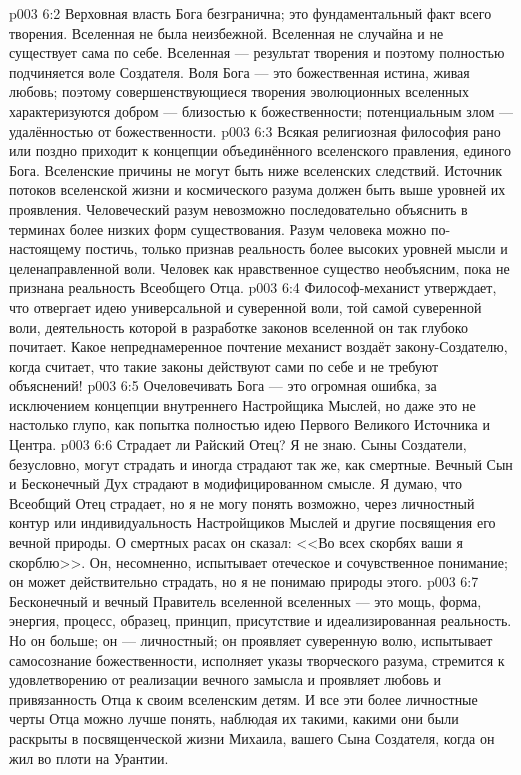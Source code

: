 \vs p003 6:2 Верховная власть Бога безгранична; это фундаментальный факт всего творения. Вселенная не была неизбежной. Вселенная не случайна и не существует сама по себе. Вселенная --- результат творения и поэтому полностью подчиняется воле Создателя. Воля Бога --- это божественная истина, живая любовь; поэтому совершенствующиеся творения эволюционных вселенных характеризуются добром --- близостью к божественности; потенциальным злом --- удалённостью от божественности.
\vs p003 6:3 \pc Всякая религиозная философия рано или поздно приходит к концепции объединённого вселенского правления, единого Бога. Вселенские причины не могут быть ниже вселенских следствий. Источник потоков вселенской жизни и космического разума должен быть выше уровней их проявления. Человеческий разум невозможно последовательно объяснить в терминах более низких форм существования. Разум человека можно по\hyp{}настоящему постичь, только признав реальность более высоких уровней мысли и целенаправленной воли. Человек как нравственное существо необъясним, пока не признана реальность Всеобщего Отца.
\vs p003 6:4 Философ\hyp{}механист утверждает, что отвергает идею универсальной и суверенной воли, той самой суверенной воли, деятельность которой в разработке законов вселенной он так глубоко почитает. Какое непреднамеренное почтение механист воздаёт закону\hyp{}Создателю, когда считает, что такие законы действуют сами по себе и не требуют объяснений!
\vs p003 6:5 Очеловечивать Бога --- это огромная ошибка, за исключением концепции внутреннего Настройщика Мыслей, но даже это не настолько глупо, как попытка полностью  идею Первого Великого Источника и Центра.
\vs p003 6:6 \pc Страдает ли Райский Отец? Я не знаю. Сыны Создатели, безусловно, могут страдать и иногда страдают так же, как смертные. Вечный Сын и Бесконечный Дух страдают в модифицированном смысле. Я думаю, что Всеобщий Отец страдает, но я не могу понять  возможно, через личностный контур или индивидуальность Настройщиков Мыслей и другие посвящения его вечной природы. О смертных расах он сказал: <<Во всех скорбях ваши я скорблю>>. Он, несомненно, испытывает отеческое и сочувственное понимание; он может действительно страдать, но я не понимаю природы этого.
\vs p003 6:7 \pc Бесконечный и вечный Правитель вселенной вселенных --- это мощь, форма, энергия, процесс, образец, принцип, присутствие и идеализированная реальность. Но он больше; он --- личностный; он проявляет суверенную волю, испытывает самосознание божественности, исполняет указы творческого разума, стремится к удовлетворению от реализации вечного замысла и проявляет любовь и привязанность Отца к своим вселенским детям. И все эти более личностные черты Отца можно лучше понять, наблюдая их такими, какими они были раскрыты в посвященческой жизни Михаила, вашего Сына Создателя, когда он жил во плоти на Урантии.
